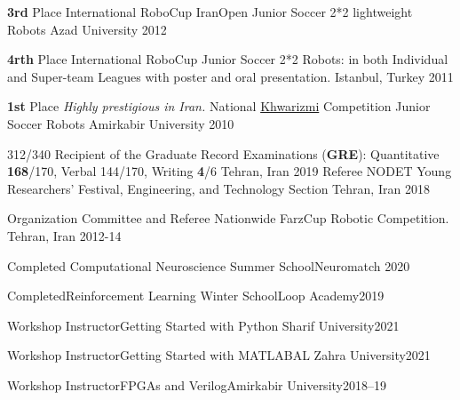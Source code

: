 \begin{cvhonors}
  \cvhonor
      {\textbf{3rd} Place}
      {International RoboCup IranOpen Junior Soccer 2*2 lightweight Robots}
      { Azad University}
        {2012}
        
   \cvhonor
   {\textbf{4rth} Place}
    {International RoboCup Junior Soccer 2*2 Robots: in both Individual and Super-team Leagues with poster and oral presentation.}
    {Istanbul, Turkey}
	{2011}
  
    
  \cvhonor
  {\textbf{1st} Place}
  {\textit{Highly prestigious in Iran.} National \href{https://en.wikipedia.org/wiki/Khwarizmi_International_Award}{Khwarizmi} Competition Junior Soccer Robots}
  {Amirkabir University}
	{2010}
\end{cvhonors}

\pagebreak




\begin{cvhonors}

  \cvhonor
    {312/340} %
    {Recipient of the Graduate Record Examinations (\textbf{GRE}): Quantitative \textbf{168}/170, Verbal 144/170, Writing \textbf{4}/6} %
    {Tehran, Iran} %
    {2019} %
     \cvhonor
  {Referee}
  {NODET Young Researchers’ Festival, Engineering, and Technology Section}
  {Tehran, Iran}
	{2018}

  \cvhonor
    {Organization Committee and Referee}
    {Nationwide FarzCup Robotic Competition.}
    {Tehran, Iran}
    {2012-14}

    
\cvhonor
{Completed}
{Computational Neuroscience Summer School}{Neuromatch}
{2020}

\cvhonor
{Completed}{Reinforcement Learning Winter School}{Loop Academy}{2019}

\cvhonor
{Workshop Instructor}{Getting Started with Python}{ Sharif University}{2021}

\cvhonor
{Workshop Instructor}{Getting Started with MATLAB}{AL Zahra University}{2021}

\cvhonor
{Workshop Instructor}{FPGAs and Verilog}{Amirkabir University}{2018–19}
\end{cvhonors}